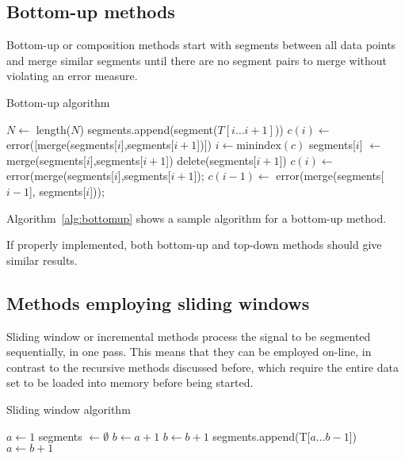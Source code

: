 \subsection{Bottom-up methods}
Bottom-up or composition methods start with segments between
all data points and merge similar segments until there are no segment
pairs to merge without violating an error measure.

\begin{algorithm}
  \caption{Bottom-up algorithm}
  \label{alg:bottomup}
  \begin{algorithmic}
    \State $N \gets $ length($N$)
     
    \State segments.append(segment($T[i\dots i+1]$))
    \EndFor
     
    \State $c(i) \gets $error([merge(segments[$i$],segments[$i+1$])])
    \EndFor
    \State $i \gets \mathrm{minindex}(c)$ 
    \State segments[$i$] $\gets$ merge(segments[$i$],segments[$i+1$]) 
    \State delete(segments[$i+1$]) 
    \State $c(i) \gets $error(merge(segments[$i$],segments[$i+1$]); 
    \State $c(i-1) \gets $ error(merge(segments[$i-1$], segments[$i$])); 
    \EndWhile
    \EndFunction
  \end{algorithmic}
\end{algorithm}

Algorithm~\ref{alg:bottomup} shows a sample algorithm for a bottom-up
method.

If properly implemented, both bottom-up and top-down methods should
give similar results.

\subsection{Methods employing sliding windows}
Sliding window or incremental methods process the signal to be
segmented sequentially, in one pass.  This means that they can be
employed on-line, in contrast to the recursive methods discussed
before, which require the entire data set to be loaded into memory
before being started.

\begin{algorithm}
  \caption{Sliding window algorithm}
  \label{alg:slidingwindow}
  \begin{algorithmic}
    \State $a \gets 1$
    \State segments $\gets\emptyset$ 
    \State $b\gets a+1$
    \State $b \gets b + 1$
    \EndWhile
    \State segments.append(T[$a\dots b-1$])
    \State $a \gets b + 1$
    \EndWhile
    \EndFunction
  \end{algorithmic}
\end{algorithm}

